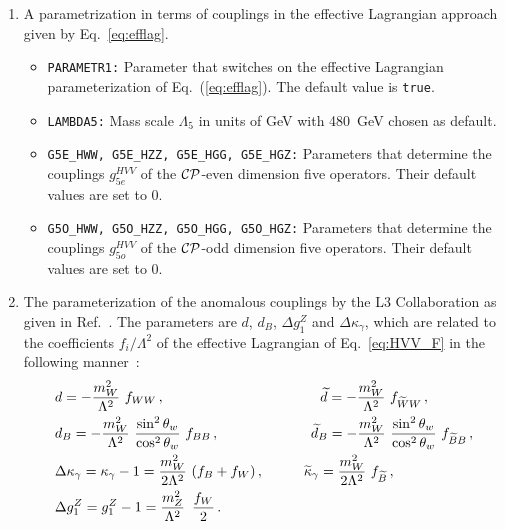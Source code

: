 \documentclass[english,12pt]{article}
\begin{document}
\begin{enumerate}
\item  A parametrization in terms of couplings in the effective Lagrangian 
  approach given by Eq.~\eqref{eq:efflag}. 
  \begin{itemize} 
   \item {\tt PARAMETR1:} Parameter that switches on the effective Lagrangian
     parameterization of Eq.~(\ref{eq:efflag}). The default value is {\tt true}.
   \item {\tt LAMBDA5:} Mass scale $\Lambda_{5}$ in units of GeV with 480~GeV chosen as default.
   \item {\tt G5E\_HWW, G5E\_HZZ, G5E\_HGG, G5E\_HGZ:} Parameters that determine
     the couplings $g_{5e}^{HVV}$ of the $\cal{CP}$-even dimension five operators.
     Their default values are set to 0.
   \item {\tt G5O\_HWW, G5O\_HZZ, G5O\_HGG, G5O\_HGZ:} Parameters that determine
     the couplings $g_{5o}^{HVV}$ of the $\cal{CP}$-odd dimension five operators.
     Their default values are set to 0.
  \end{itemize}
%
\item The parameterization of the anomalous couplings by the L3 Collaboration as
given in Ref.~\cite{Achard:2004kn}. The parameters are $d$, $d_B$, $\Delta
g_1^Z$ and $\Delta \kappa_\gamma$, which are related to the coefficients $f_{i}/\Lambda^{2}$ of the effective Lagrangian of Eq.~\eqref{eq:HVV_F} in the following manner~\cite{Hankele:2006ma}: 
\begin{align} \label{eq:param2}
\begin{split}
&d = -\frac{m_W^2}{\Lambda^2}\ f_{WW}\,, \hspace{3.9cm} \widetilde{d} =
-\frac{m_W^2}{\Lambda^2}\ f_{\widetilde{W}W}\,,\\
&d_B = - \frac{m_W^2}{\Lambda^2}\
\frac{\sin^2{\theta_w}}{\cos^2{\theta_w}}\ f_{BB}\,, \hspace{2.3cm}
\widetilde{d}_B = -\frac{m_W^2}{\Lambda^2}\
\frac{\sin^2{\theta_w}}{\cos^2{\theta_w}}\ f_{\widetilde{B}B}\,,\\
&\Delta \kappa_\gamma = \kappa_\gamma -1 = \frac{m_W^2}{2 \Lambda^2} \
(f_B + f_W)\,, \hspace{1cm} \widetilde{\kappa}_\gamma = \frac{m_W^2}{2
  \Lambda^2}\ f_{\widetilde{B}}\,,\\
&\Delta g_1^Z = g_1^Z -1 = \frac{m_Z^2}{\Lambda^2}\, \ \frac{f_W}{2}\,.
\end{split}
\end{align}

\end{enumerate}
\end{document}
